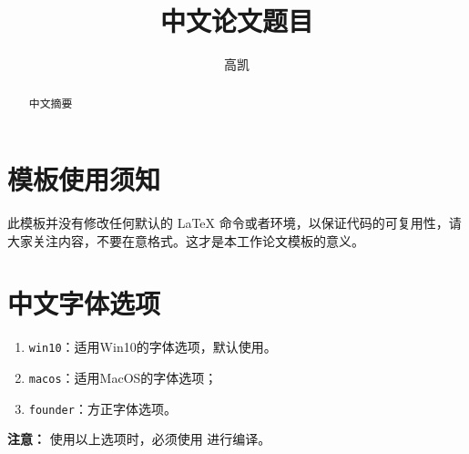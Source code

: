 \documentclass[lang=cn,11pt,a4paper,cite=number, win10]{etpaper}
\title{中文论文题目}
\author{高凯}
\institute{（天津大学电气自动化与信息工程学院，天津~300072）}
\date{\zhtoday}
\begin{document}
\maketitle

\begin{abstract}
中文摘要

\keywords{}
\end{abstract}



\section{模板使用须知}


此模板并没有修改任何默认的 \LaTeX{} 命令或者环境，以保证代码的可复用性，请大家关注内容，不要在意格式。这才是本工作论文模板的意义。

\section{中文字体选项}

\begin{enumerate}
\item \lstinline{win10}：适用Win10的字体选项，默认使用。
\item \lstinline{macos}：适用MacOS的字体选项；
\item \lstinline{founder}：方正字体选项。
\end{enumerate}

\noindent \textbf{注意：} 使用以上选项时，必须使用  进行编译。



\cite{Cui2007}




\end{document}
